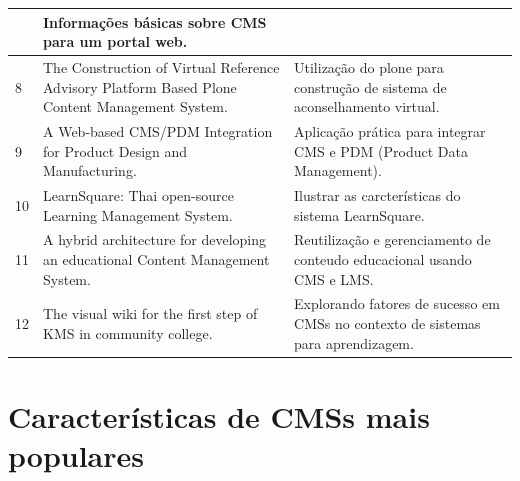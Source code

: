 \begin{apendicesenv}
\begin{landscape}
\begin{longtable}{|p{10pt}|p{320pt}|p{315pt}|}
 	 & {\raggedright Informações básicas sobre CMS para um portal web.\cite{Nakwaski2010}}\\
 	\hline
 	 {\raggedright 8}
 	 & {\raggedright The {Construction} of {Virtual} {Reference} {Advisory} {Platform} {Based} {Plone} {Content} {Management} {System}.}
 	 & {\raggedright Utilização do plone para construção de sistema de aconselhamento virtual.\cite{Lina2010}}\\
 	\hline
 	 {\raggedright 9} 
 	 & {\raggedright A {Web}-based {CMS}/{PDM} {Integration} for {Product} {Design} and {Manufacturing}.}
& {\raggedright Aplicação prática para integrar CMS e PDM (Product Data Management). \cite{Yen2008}
}\\
 	\hline 
{\raggedright 10}
 	 & {\raggedright 
 	{LearnSquare}: {Thai} open-source {Learning} {Management} {System}.}
 	 & {\raggedright Ilustrar as carcterísticas do sistema LearnSquare.\cite{Mekpiroon2008}}\\
 	\hline
 	 {\raggedright 11}
 	 & {\raggedright A hybrid architecture for developing an educational {Content} {Management} {System}.}
 	 & {\raggedright Reutilização e gerenciamento de conteudo educacional usando CMS e LMS.\cite{Vasques2011}}\\
 	\hline
 	 {\raggedright 12} 
 	 & {\raggedright The visual wiki for the first step of {KMS} in community college.}
& {\raggedright Explorando fatores de sucesso em CMSs no contexto de sistemas para aprendizagem. \cite{Yusoff2011}
}\\
 	\hline 	
\end{longtable} 	

\clearpage	
\section{Características de CMSs mais populares}


\end{landscape}
\end{apendicesenv}
